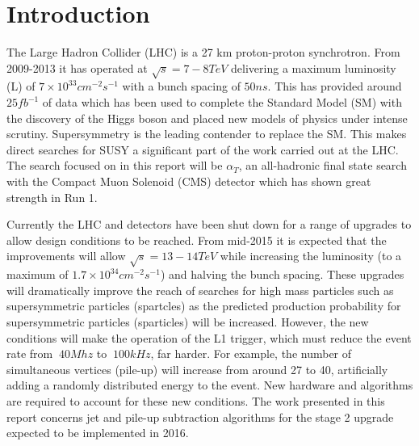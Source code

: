 
\chapter{Introduction} %

\label{Chapter1} %


The Large Hadron Collider (LHC) is a 27 km proton-proton synchrotron. From 2009-2013 it has operated at $\sqrt{s}=7-8TeV$ delivering a maximum luminosity (L) of $7 \times 10^{33} cm^{-2}s^{-1}$ with a bunch spacing of $50ns$\cite{run1}. This has provided around $25fb^{-1}$ of data which has been used to complete the Standard Model (SM) with the discovery of the Higgs boson and placed new models of physics under intense scrutiny\cite{cmshiggs}\cite{atlashiggs}\cite{susyr1}. Supersymmetry is the leading contender to replace the SM. This makes direct searches for SUSY a significant part of the work carried out at the LHC. The search focused on in this report will be $\alpha_T$, an all-hadronic final state search with the Compact Muon Solenoid (CMS) detector which has shown great strength in Run 1\cite{search}. 

Currently the LHC and detectors have been shut down for a range of upgrades to allow design conditions to be reached\cite{ls1}. From mid-2015 it is expected that the improvements will allow $\sqrt{s}=13-14TeV$ while increasing the luminosity (to a maximum of $1.7\times10^34cm^{-2}s^{-1}$) and halving the bunch spacing\cite{HighLumi}. These upgrades will dramatically improve the reach of searches for high mass particles such as supersymmetric particles (spartcles) as the predicted production probability for supersymmetric particles (sparticles)\cite{ProjectedCx} will be increased. However, the new conditions will make the operation of the L1 trigger, which must reduce the event rate from $~40Mhz$ to $~100kHz$, far harder. For example, the number of simultaneous vertices (pile-up) will increase from around 27 to 40, artificially adding a randomly distributed energy to the event. New hardware and algorithms are required to account for these new conditions. The work presented in this report concerns jet and pile-up subtraction algorithms for the stage 2 upgrade expected to be implemented in 2016.  












